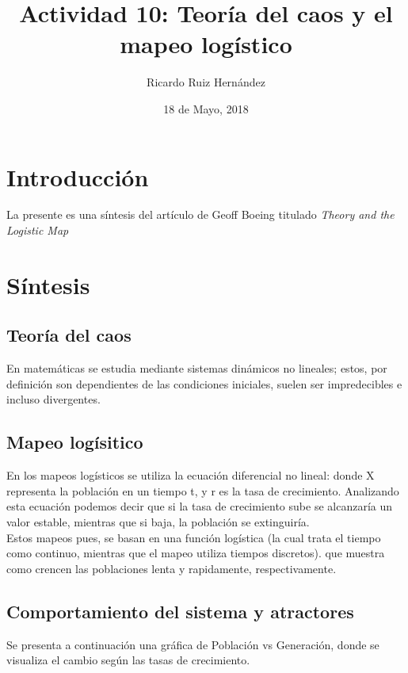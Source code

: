 \documentclass{article}
\title{Actividad 10: Teoría del caos y el mapeo logístico}
\author{Ricardo Ruiz Hernández}
\date{18 de Mayo, 2018}
\begin{document}
\maketitle 
\section{Introducción}
La presente es una síntesis del artículo de Geoff Boeing titulado \textit{Theory and the Logistic Map}  

\section{Síntesis}
\subsection{Teoría del caos}
En matemáticas se estudia mediante sistemas dinámicos no lineales; estos, por definición son dependientes de las condiciones iniciales, suelen ser impredecibles e incluso divergentes. 

\subsection{Mapeo logísitico}
En los mapeos logísticos se utiliza la ecuación diferencial no lineal: 
donde X representa la población en un tiempo t, y r es la tasa de crecimiento. Analizando esta ecuación podemos decir que si la tasa de crecimiento sube se alcanzaría un valor estable, mientras que si baja, la población se extinguiría.\\
Estos mapeos pues, se basan en una función logística (la cual trata el tiempo como continuo, mientras que el mapeo utiliza tiempos discretos). que muestra como crencen las poblaciones lenta y rapidamente, respectivamente.

\subsection{Comportamiento del sistema y atractores}
Se presenta a continuación una gráfica de Población vs Generación, donde se visualiza el cambio según las tasas de crecimiento.
\end{document}

